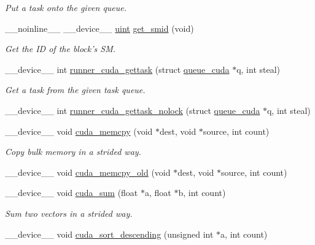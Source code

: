 \begin{DoxyCompactItemize}
\begin{DoxyCompactList}\small\item\em Put a task onto the given queue. \end{DoxyCompactList}\item 
\-\_\-\-\_\-noinline\-\_\-\-\_\- \-\_\-\-\_\-device\-\_\-\-\_\- \hyperlink{cutil__math_8h_a91ad9478d81a7aaf2593e8d9c3d06a14}{uint} \hyperlink{runner__cuda_8cu_a9b15b637f9f95f8fa7cdfd82b9c6850b}{get\-\_\-smid} (void)
\begin{DoxyCompactList}\small\item\em Get the I\-D of the block's S\-M. \end{DoxyCompactList}\item 
\-\_\-\-\_\-device\-\_\-\-\_\- int \hyperlink{runner__cuda_8cu_a0acaac4463958ebb0bb3b44331c8336a}{runner\-\_\-cuda\-\_\-gettask} (struct \hyperlink{structqueue__cuda}{queue\-\_\-cuda} $\ast$q, int steal)
\begin{DoxyCompactList}\small\item\em Get a task from the given task queue. \end{DoxyCompactList}\item 
\-\_\-\-\_\-device\-\_\-\-\_\- int \hyperlink{runner__cuda_8cu_ae2ff2ee002de54b831589e87e7d9e0c1}{runner\-\_\-cuda\-\_\-gettask\-\_\-nolock} (struct \hyperlink{structqueue__cuda}{queue\-\_\-cuda} $\ast$q, int steal)
\item 
\-\_\-\-\_\-device\-\_\-\-\_\- void \hyperlink{runner__cuda_8cu_a0c54b12fff51973c046378b4d86dbb20}{cuda\-\_\-memcpy} (void $\ast$dest, void $\ast$source, int count)
\begin{DoxyCompactList}\small\item\em Copy bulk memory in a strided way. \end{DoxyCompactList}\item 
\-\_\-\-\_\-device\-\_\-\-\_\- void \hyperlink{runner__cuda_8cu_ad5f3cd9b1432f30ded613655992627b9}{cuda\-\_\-memcpy\-\_\-old} (void $\ast$dest, void $\ast$source, int count)
\item 
\-\_\-\-\_\-device\-\_\-\-\_\- void \hyperlink{runner__cuda_8cu_ae0c16e79b4b365dc93f0f16ca79de787}{cuda\-\_\-sum} (float $\ast$a, float $\ast$b, int count)
\begin{DoxyCompactList}\small\item\em Sum two vectors in a strided way. \end{DoxyCompactList}\item 
\-\_\-\-\_\-device\-\_\-\-\_\- void \hyperlink{runner__cuda_8cu_a86eff53a000379a0773f8e442ea9a59a}{cuda\-\_\-sort\-\_\-descending} (unsigned int $\ast$a, int count)

\end{DoxyCompactItemize}
